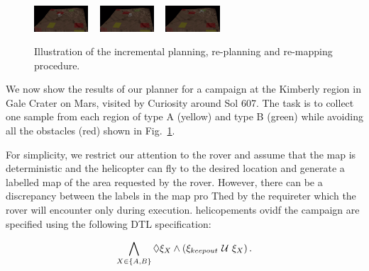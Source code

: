 \documentclass[letterpaper]{article} %
\begin{document}
\begin{figure}[t!]
{		\includegraphics[width=0.18\textwidth]{figs/pdf_4.png} ~ \includegraphics[width=0.18\textwidth]{figs/pdf_5.png} ~ \includegraphics[width=0.18\textwidth]{figs/pdf_6.png} 
	}
	\caption{Illustration of the incremental planning, re-planning and re-mapping procedure.}
	\label{fig:simulation}
\end{figure}

We now show the results of our planner for a campaign at the Kimberly region in Gale Crater on Mars, visited by Curiosity around Sol 607. 
The task is to collect one sample from each region of type A (yellow) and type B (green) while avoiding all the obstacles (red) shown in Fig.~\ref{fig:simulation}.

For simplicity, we restrict our attention to the rover and assume that the map is deterministic and the helicopter can fly to the desired location and generate a labelled map of the area requested by the rover. 
However, there can be a discrepancy between the labels in the map pro
Thed by the requireter which the rover will encounter only during execution. helicopements ovidf the campaign are specified using the following DTL specification:

\begin{equation}
    \bigwedge_{X \in \{A,B \}} \lozenge \xi_X \land \left( \xi_{keepout} \ \mathcal{U}\  \xi_X \right).
\end{equation}
\end{document}
